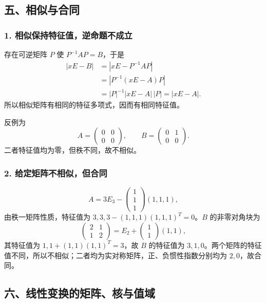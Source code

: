\documentclass[11pt,fontset=fandol]{ctexart}
\begin{document}
\subsection{五、相似与合同}\label{ux4e94ux76f8ux4f3cux4e0eux5408ux540c}

\subsubsection{1.
相似保持特征值，逆命题不成立}\label{ux76f8ux4f3cux4fddux6301ux7279ux5f81ux503cux9006ux547dux9898ux4e0dux6210ux7acb}

存在可逆矩阵 \(P\) 使 \(P^{-1}AP=B\)，于是 \[
\begin{aligned}
|xE-B|&=|xE-P^{-1}AP|\\
&=|P^{-1}(xE-A)P|\\
&=|P|^{-1}|xE-A|\,|P|=|xE-A|.
\end{aligned}
\] 所以相似矩阵有相同的特征多项式，因而有相同特征值。

反例为 \[
A=\begin{pmatrix}0&0\\0&0\end{pmatrix},\qquad
B=\begin{pmatrix}0&1\\0&0\end{pmatrix}.
\] 二者特征值均为零，但秩不同，故不相似。

\subsubsection{2.
给定矩阵不相似，但合同}\label{ux7ed9ux5b9aux77e9ux9635ux4e0dux76f8ux4f3cux4f46ux5408ux540c}

\[
A=3E_3-\begin{pmatrix}1\\1\\1\end{pmatrix}(1,1,1),
\] 由秩一矩阵性质，特征值为 \(3,3,3-(1,1,1)(1,1,1)^T=0\)。\(B\)
的非零对角块为 \[
\begin{pmatrix}2&1\\1&2\end{pmatrix}
=E_2+\begin{pmatrix}1\\1\end{pmatrix}(1,1),
\] 其特征值为 \(1,1+(1,1)(1,1)^T=3\)，故 \(B\) 的特征值为
\(3,1,0\)。两个矩阵的特征值不同，所以不相似；二者均为实对称矩阵，正、负惯性指数分别均为
\(2,0\)，故合同。

\subsection{六、线性变换的矩阵、核与值域}\label{ux516dux7ebfux6027ux53d8ux6362ux7684ux77e9ux9635ux6838ux4e0eux503cux57df}
\end{document}
